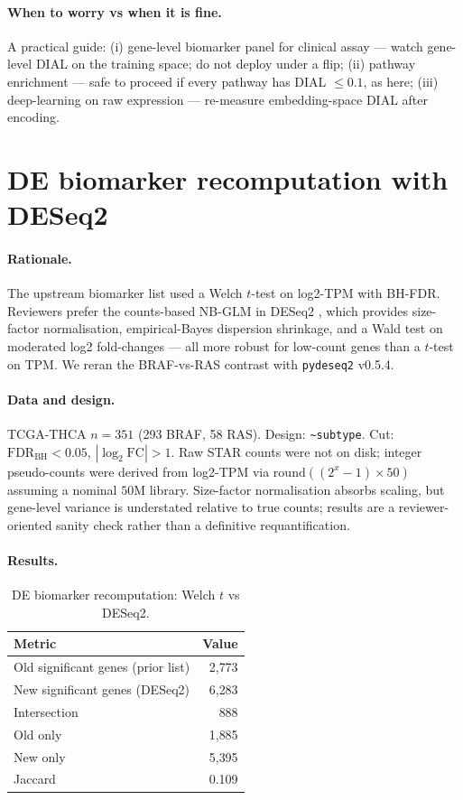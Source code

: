 \documentclass[11pt,a4paper]{article}
\begin{document}
\paragraph{When to worry vs when it is fine.} A practical guide:
(i) gene-level biomarker panel for clinical assay --- watch gene-level
DIAL on the training space; do not deploy under a flip; (ii) pathway
enrichment --- safe to proceed if every pathway has DIAL $\leq 0.1$, as
here; (iii) deep-learning on raw expression --- re-measure
embedding-space DIAL after encoding.

\section{DE biomarker recomputation with DESeq2}
\label{sec:S5}

\paragraph{Rationale.} The upstream biomarker list used a Welch
$t$-test on log2-TPM with BH-FDR. Reviewers prefer the counts-based
NB-GLM in DESeq2 \citep{love2014deseq2, muzellec2023pydeseq2}, which
provides size-factor normalisation, empirical-Bayes dispersion
shrinkage, and a Wald test on moderated log2 fold-changes --- all
more robust for low-count genes than a $t$-test on TPM. We reran the
BRAF-vs-RAS contrast with \texttt{pydeseq2} v0.5.4.

\paragraph{Data and design.} TCGA-THCA $n=351$ (293 BRAF, 58 RAS).
Design: \texttt{\textasciitilde subtype}. Cut:
$\mathrm{FDR}_{\mathrm{BH}} < 0.05$, $|\log_2\mathrm{FC}| > 1$. Raw
STAR counts were not on disk; integer pseudo-counts were derived from
log2-TPM via $\mathrm{round}((2^x - 1) \times 50)$ assuming a nominal
$50$M library. Size-factor normalisation absorbs scaling, but gene-level
variance is understated relative to true counts; results are a
reviewer-oriented sanity check rather than a definitive requantification.

\paragraph{Results.}
\begin{table}[htbp]
\centering
\small
\begin{tabular}{lr}\toprule
Metric & Value \\ \midrule
Old significant genes (prior list) & 2{,}773 \\
New significant genes (DESeq2) & 6{,}283 \\
Intersection & 888 \\
Old only & 1{,}885 \\
New only & 5{,}395 \\
Jaccard & 0.109 \\
\bottomrule\end{tabular}
\caption{DE biomarker recomputation: Welch $t$ vs DESeq2.}
\label{tab:s5}
\end{table}
\end{document}
